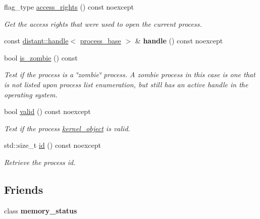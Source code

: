 \begin{DoxyCompactItemize}
flag\+\_\+type \mbox{\hyperlink{classdistant_1_1kernel__objects_1_1process_a28b2a7b7297714d4c7c4d320a0c4fbbc}{access\+\_\+rights}} () const noexcept
\begin{DoxyCompactList}\small\item\em Get the access rights that were used to open the current process. \end{DoxyCompactList}\item 
\mbox{\label{classdistant_1_1kernel__objects_1_1process_a3476af5b30ce778a41eed891fdd93ece}} 
const \mbox{\hyperlink{classdistant_1_1handle}{distant\+::handle}}$<$ \mbox{\hyperlink{classdistant_1_1kernel__objects_1_1process__base}{process\+\_\+base}} $>$ \& {\bfseries handle} () const noexcept
\item 
bool \mbox{\hyperlink{classdistant_1_1kernel__objects_1_1process_ab023cd4a4d27ccef7879d1a3c513148b}{is\+\_\+zombie}} () const
\begin{DoxyCompactList}\small\item\em Test if the process is a \char`\"{}zombie\char`\"{} process. A zombie process in this case is one that is not listed upon process list enumeration, but still has an active handle in the operating system. \end{DoxyCompactList}\item 
bool \mbox{\hyperlink{classdistant_1_1kernel__objects_1_1process_a6299b49ad8fb1c22e54dc9aa6c3a09b2}{valid}} () const noexcept
\begin{DoxyCompactList}\small\item\em Test if the process \mbox{\hyperlink{classdistant_1_1kernel__objects_1_1kernel__object}{kernel\+\_\+object}} is valid. \end{DoxyCompactList}\item 
std\+::size\+\_\+t \mbox{\hyperlink{classdistant_1_1kernel__objects_1_1process_a553b90767de864164d807075f67c1402}{id}} () const noexcept
\begin{DoxyCompactList}\small\item\em Retrieve the process id. \end{DoxyCompactList}\end{DoxyCompactItemize}
\subsection*{Friends}
\begin{DoxyCompactItemize}
\item 
\mbox{\label{classdistant_1_1kernel__objects_1_1process_adaff6948d20e49253266449bb112a8e8}} 
class {\bfseries memory\+\_\+status}
\end{DoxyCompactItemize}


